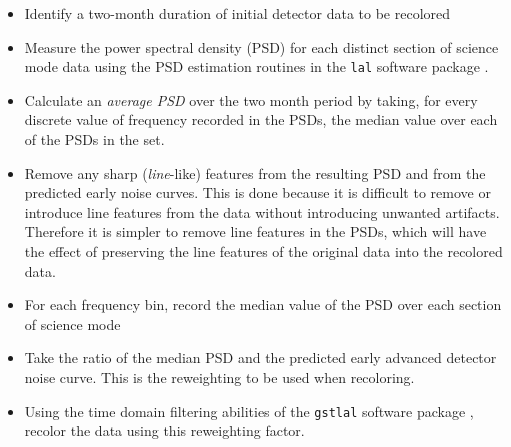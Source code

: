 \begin{itemize}
 \item Identify a two-month duration of initial detector data to be 
recolored
 \item Measure the power spectral density (PSD) for each distinct section 
of science mode data using the PSD estimation routines in the \texttt{lal} 
software package \cite{LAL}.
 \item Calculate an \emph{average PSD} over the two month period by taking, for
every discrete value of frequency recorded in the PSDs, the median value over
each of the PSDs in the set.
 \item Remove any sharp ({\it line}-like) features from the resulting PSD and from the predicted
early noise curves. This is done because it is difficult to remove or introduce 
line features from the data without introducing unwanted artifacts. Therefore 
it is simpler to remove line features in the PSDs, which will have the effect 
of preserving the line features of the original data into the recolored 
data.
 \item For each frequency bin, record the median value of the PSD over each 
section of science mode
 \item Take the ratio of the median PSD and the predicted early advanced
detector noise curve.
 This is the reweighting to be used when recoloring.
 \item Using the time domain filtering abilities of the \texttt{gstlal}
software package \cite{GSTLAL}, recolor the data using this reweighting factor.
\end{itemize}

